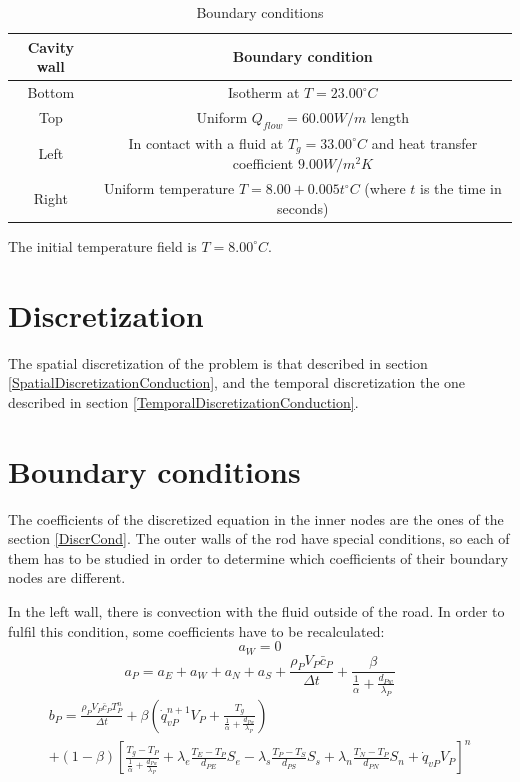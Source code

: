 \begin{table}
	\centering
	\begin{tabular}{ |c|c|}
		\hline
		Cavity wall & Boundary condition \\ \hline
		Bottom & Isotherm at $T=23.00 ^{\circ}C$ \\ \hline
		Top & Uniform $Q_{flow}=60.00 W/m$ length \\ \hline
		Left & In contact with a fluid at $T_{g}=33.00 ^{\circ}C$ and heat transfer coefficient $9.00 W/m^{2}K$ \\ \hline
		Right & Uniform temperature $T=8.00+0.005t ^{\circ}C$ (where $t$ is the time in seconds) \\ \hline
	\end{tabular}
\caption{Boundary conditions}
\end{table}

The initial temperature field is $T=8.00 ^{\circ}C$.

\section{Discretization}
The spatial discretization of the problem is that described in section \ref{SpatialDiscretizationConduction}, and the temporal discretization the one described in section \ref{TemporalDiscretizationConduction}.

\section{Boundary conditions}
The coefficients of the discretized equation in the inner nodes are the ones of the section \ref{DiscrCond}. The outer walls of the rod have special conditions, so each of them has to be studied in order to determine which coefficients of their boundary nodes are different.

In the left wall, there is convection with the fluid outside of the road. In order to fulfil this condition, some coefficients have to be recalculated:
\begin{equation}
a_{W}=0
\end{equation}
\begin{equation}
a_{P}=a_{E}+a_{W}+a_{N}+a_{S}+\frac{\rho_{P}V_{P}\bar{c}_{P}}{\Delta t}+\frac{\beta}{\frac{1}{\alpha}+\frac{d_{Pw}}{\lambda_{P}}}
\end{equation}
\begin{multline}
b_{P}=\frac{\rho_{P}V_{P}\bar{c}_{P}T_{P}^{n}}{\Delta t}+\beta\left(\dot{q}_{vP}^{n+1}V_{P}+\frac{T_{g}}{\frac{1}{\alpha}+\frac{d_{Pw}}{\lambda_{P}}}\right) \\
+\left(1-\beta\right)\left[\frac{T_{g}-T_{P}}{\frac{1}{\alpha}+\frac{d_{Pw}}{\lambda_{P}}}+\lambda_{e}\frac{T_{E}-T_{P}}{d_{PE}}S_{e}-\lambda_{s}\frac{T_{P}-T_{S}}{d_{PS}}S_{s}+\lambda_{n}\frac{T_{N}-T_{P}}{d_{PN}}S_{n}+\dot{q}_{vP}V_{P}\right]^{n}
\end{multline}

